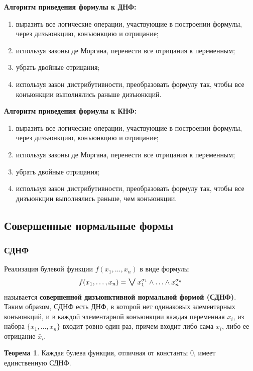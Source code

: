 \documentclass[a5paper, 11pt]{extarticle}
\theoremstyle{definition}
\newtheorem*{theorem*}{Теорема}
\theoremstyle{definition}
\theoremstyle{definition}
\numberwithin{figure}{section}
\numberwithin{table}{section}
\DeclareMathOperator{\biglor}{\mathrel{\raisebox{-.4ex}{$\mathlarger{\mathlarger{\mathlarger{\mathlarger{\lor}}}}$}}}
\begin{document}
\noindent \textbf{Алгоритм приведения формулы к ДНФ:}
\begin{enumerate}
    \item выразить все логические операции, участвующие в построении формулы, через дизъюнкцию, конъюнкцию и отрицание;
    \item используя законы де Моргана, перенести все отрицания к переменным;
    \item убрать двойные отрицания;
    \item используя закон дистрибутивности, преобразовать формулу так, чтобы все конъюнкции выполнялись раньше дизъюнкций.
\end{enumerate}

\noindent \textbf{Алгоритм приведения формулы к КНФ:}
\begin{enumerate}
    \item выразить все логические операции, участвующие в построении формулы, через дизъюнкцию, конъюнкцию и отрицание;
    \item используя законы де Моргана, перенести все отрицания к переменным;
    \item убрать двойные отрицания;
    \item используя закон дистрибутивности, преобразовать формулу так, чтобы все дизъюнкции выполнялись раньше, чем конъюнкции.
\end{enumerate}

\subsection{Совершенные нормальные формы}

\subsubsection{СДНФ}

Реализация булевой функции \(f(x_1, \ldots, x_n)\) в виде формулы
\[
    f(x_1, \ldots, x_n) = \biglor x_1^{\sigma_1} \land \ldots \land x_n^{\sigma_n}
\]
называется \textbf{совершенной дизъюнктивной нормальной формой (СДНФ)}. Таким образом, СДНФ есть ДНФ, в которой нет одинаковых элементарных конъюнкций, и в каждой элементарной конъюнкции каждая переменная \(x_i\), из набора \(\{x_1, \ldots, x_n\}\) входит ровно один раз, причем входит либо сама \(x_i\), либо ее отрицание \(\bar{x}_i\).

\begin{theorem*}
    Каждая булева функция, отличная от константы \(0\), имеет единственную СДНФ.
\end{theorem*}
\end{document}
